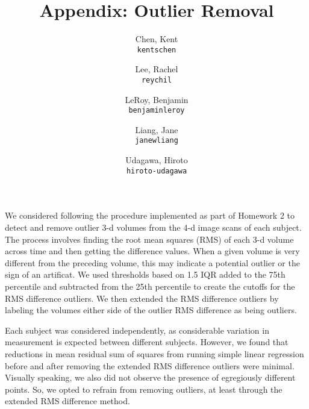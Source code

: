 \documentclass[11pt]{article}
\title{Appendix: Outlier Removal}
\author{
  Chen, Kent\\
  \texttt{kentschen}
  \and
  Lee, Rachel\\
  \texttt{reychil}
  \and
  LeRoy, Benjamin\\
  \texttt{benjaminleroy}
  \and
  Liang, Jane\\
  \texttt{janewliang}
  \and
  Udagawa, Hiroto\\
  \texttt{hiroto-udagawa}
}
\begin{document}
\maketitle

We considered following the procedure implemented as part of Homework 2 to 
detect and remove outlier 3-d volumes from the 4-d image scans of each subject. 
The process involves finding the root mean squares (RMS) of each 3-d volume 
across time and then getting the difference values. When a given volume is very 
different from the preceding volume, this may indicate a potential outlier or 
the sign of an artificat. We used thresholds based on 1.5 \times IQR added to 
the 75th percentile and subtracted from the 25th percentile to create the 
cutoffs for the RMS difference outliers. We then extended the RMS difference 
outliers by labeling the volumes either side of the outlier RMS difference as 
being outliers. 

Each subject was considered independently, as considerable variation in 
measurement is expected between different subjects. However, we found that 
reductions in mean residual sum of squares from running simple linear regression 
before and after removing the extended RMS difference outliers were minimal. 
Visually speaking, we also did not observe the presence of egregiously different 
points. So, we opted to refrain from removing outliers, at least through the 
extended RMS difference method. 


\end{document}
